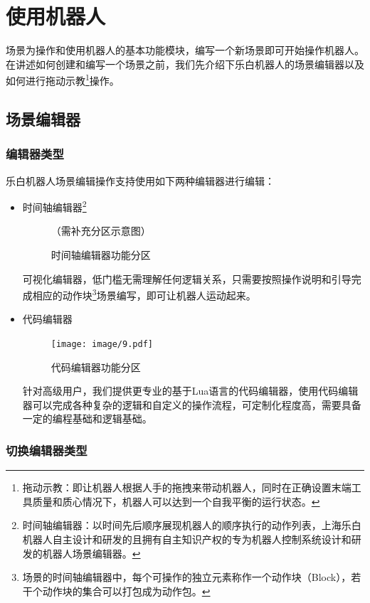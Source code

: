 \chapter{使用机器人}

场景为操作和使用机器人的基本功能模块，编写一个新场景即可开始操作机器人。在讲述如何创建和编写一个场景之前，我们先介绍下乐白机器人的场景编辑器以及如何进行拖动示教\footnote{拖动示教：即让机器人根据人手的拖拽来带动机器人，同时在正确设置末端工具质量和质心情况下，机器人可以达到一个自我平衡的运行状态。}操作。
\section{场景编辑器}
\subsection{编辑器类型}
乐白机器人场景编辑操作支持使用如下两种编辑器进行编辑：
\begin{itemize}
	\item 时间轴编辑器\footnote{时间轴编辑器：以时间先后顺序展现机器人的顺序执行的动作列表，上海乐白机器人自主设计和研发的且拥有自主知识产权的专为机器人控制系统设计和研发的机器人场景编辑器。}

	\begin{figure}[ht]
		\centering
		\color{red}（需补充分区示意图）
		\caption{时间轴编辑器功能分区}
		\label{fig:时间轴编辑器功能分区}
	\end{figure}

	可视化编辑器，低门槛无需理解任何逻辑关系，只需要按照操作说明和引导完成相应的动作块\footnote{场景的时间轴编辑器中，每个可操作的独立元素称作一个动作块（Block），若干个动作块的集合可以打包成为动作包。}场景编写，即可让机器人运动起来。

	\item 代码编辑器
	
	\begin{figure}[ht]
		\centering
		\texttt{[image: image/9.pdf]}
		\caption{代码编辑器功能分区}
		\label{fig:代码编辑器功能分区}
	\end{figure}

	针对高级用户，我们提供更专业的基于Lua语言的代码编辑器，使用代码编辑器可以完成各种复杂的逻辑和自定义的操作流程，可定制化程度高，需要具备一定的编程基础和逻辑基础。

\end{itemize}

\subsection{切换编辑器类型}

